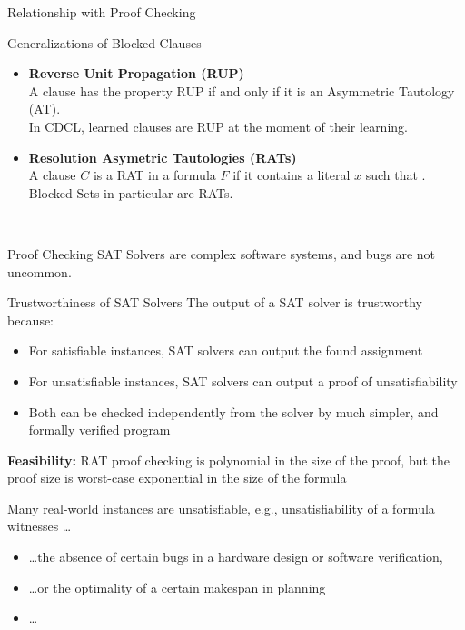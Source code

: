 \documentclass[t]{sdqbeamer}
\begin{document}
\begin{frame}{Relationship with Proof Checking}
\begin{block}{Generalizations of Blocked Clauses}~\\
\begin{itemize}\setlength{\itemsep}{1em}
    \item \textbf{Reverse Unit Propagation (RUP)}\\[1pt]
    A clause has the property RUP if and only if it is an Asymmetric Tautology (AT).\\[1ex]
    In CDCL, learned clauses are RUP at the moment of their learning.
    \item \textbf{Resolution Asymetric Tautologies (RATs)}\\[1pt]
    A clause $C$ is a RAT in a formula $F$ if it contains a literal $x$ such that .\\[1ex]
    Blocked Sets in particular are RATs.
\end{itemize}
~\\
\end{block}
\end{frame}


\begin{frame}{Proof Checking}
\vspace*{-1em}
SAT Solvers are complex software systems, and bugs are not uncommon.
\begin{block}{Trustworthiness of SAT Solvers}
The output of a SAT solver is trustworthy because:
\begin{itemize}\setlength{\itemsep}{1ex}
    \item For satisfiable instances, SAT solvers can output the found assignment
    \item For unsatisfiable instances, SAT solvers can output a proof of unsatisfiability
    \item Both can be checked independently from the solver by much simpler, and formally verified program
\end{itemize}
\textbf{Feasibility:} RAT proof checking is polynomial in the size of the proof, but the proof size is worst-case exponential in the size of the formula
\end{block}
\begin{example}[Applications]
Many real-world instances are unsatisfiable, e.g., unsatisfiability of a formula witnesses \dots
\begin{itemize}
    \item \dots the absence of certain bugs in a hardware design or software verification, 
    \item \dots or the optimality of a certain makespan in planning
    \item \dots  
\end{itemize} 
\end{example}
\end{frame}
\end{document}
